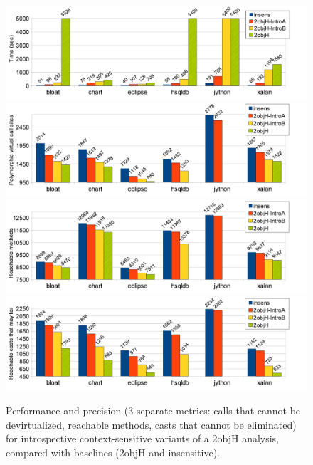 \begin{figure}[tbp]
\begin{center}
\includegraphics[scale=0.54]{assets/introspective/2objHtime.pdf} \\
\includegraphics[scale=0.54]{assets/introspective/2objHvcalls.pdf} \\
\includegraphics[scale=0.54]{assets/introspective/2objHmeths.pdf} \\
\includegraphics[scale=0.54]{assets/introspective/2objHcasts.pdf}
\end{center}
\vspace{-0.65cm}
\caption{Performance and precision (3 separate metrics: calls that
  cannot be devirtualized, reachable methods, casts that cannot be
  eliminated) for introspective context-sensitive variants of a 2objH
  analysis, compared with baselines (2objH and insensitive).}
\label{2objH-chart}
\end{figure}


